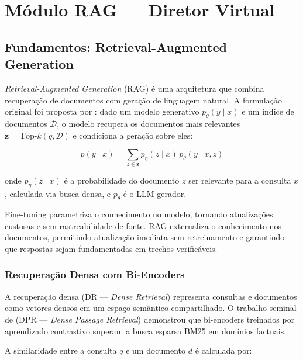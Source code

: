 \documentclass[12pt,a4paper]{report}
\begin{document}
\chapter{Módulo RAG — Diretor Virtual}

\section{Fundamentos: Retrieval-Augmented Generation}

\textit{Retrieval-Augmented Generation} (RAG) é uma arquitetura que combina
recuperação de documentos com geração de linguagem natural.
A formulação original foi proposta por \textcite{lewis2020rag}:
dado um modelo generativo \(p_\theta(y \mid x)\) e um índice de documentos $\mathcal{D}$,
o modelo recupera os documentos mais relevantes \(\mathbf{z} = \text{Top-}k(q, \mathcal{D})\)
e condiciona a geração sobre eles:

\begin{equation}
  p(y \mid x) = \sum_{z \in \mathbf{z}} p_\eta(z \mid x)\, p_\theta(y \mid x, z)
  \label{eq:rag}
\end{equation}

onde $p_\eta(z \mid x)$ é a probabilidade do documento $z$ ser relevante para
a consulta $x$, calculada via busca densa, e $p_\theta$ é o LLM gerador.

\begin{insight}[title=Por que RAG e não fine-tuning?]
Fine-tuning parametriza o conhecimento no modelo, tornando atualizações
custosas e sem rastreabilidade de fonte. RAG externaliza o conhecimento
nos documentos, permitindo atualização imediata sem retreinamento e
garantindo que respostas sejam fundamentadas em trechos verificáveis.
\end{insight}

\subsection{Recuperação Densa com Bi-Encoders}

A recuperação densa (DR — \textit{Dense Retrieval}) representa consultas e
documentos como vetores densos em um espaço semântico compartilhado.
O trabalho seminal de \textcite{karpukhin2020dpr} (DPR —
\textit{Dense Passage Retrieval}) demonstrou que bi-encoders treinados por
aprendizado contrastivo superam a busca esparsa BM25 em domínios factuais.

A similaridade entre a consulta $q$ e um documento $d$ é calculada por:
\end{document}
